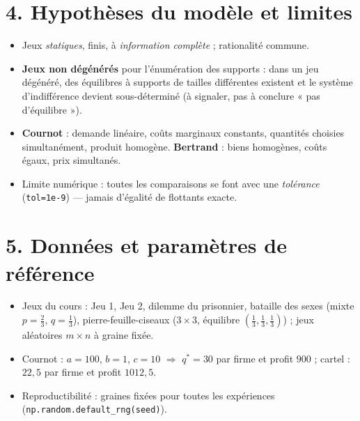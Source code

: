 \documentclass[11pt,a4paper]{article}
\begin{document}
\section*{4. Hypothèses du modèle et limites}
\begin{itemize}
  \item Jeux \emph{statiques}, finis, à \emph{information complète} ; rationalité commune.
  \item \textbf{Jeux non dégénérés} pour l'énumération des supports : dans un jeu dégénéré, des
        équilibres à supports de tailles différentes existent et le système d'indifférence
        devient sous-déterminé (à signaler, pas à conclure « pas d'équilibre »).
  \item \textbf{Cournot} : demande linéaire, coûts marginaux constants, quantités choisies
        simultanément, produit homogène. \textbf{Bertrand} : biens homogènes, coûts égaux,
        prix simultanés.
  \item Limite numérique : toutes les comparaisons se font avec une \emph{tolérance}
        (\texttt{tol=1e-9}) --- jamais d'égalité de flottants exacte.
\end{itemize}

\section*{5. Données et paramètres de référence}
\begin{itemize}
  \item Jeux du cours : Jeu 1, Jeu 2, dilemme du prisonnier, bataille des sexes
        (mixte $p=\tfrac23$, $q=\tfrac13$), pierre-feuille-ciseaux ($3\times3$, équilibre
        $(\tfrac13,\tfrac13,\tfrac13)$) ; jeux aléatoires $m\times n$ à graine fixée.
  \item Cournot : $a=100$, $b=1$, $c=10$ $\Rightarrow$ $q^{*}=30$ par firme et profit $900$ ;
        cartel : $22{,}5$ par firme et profit $1012{,}5$.
  \item Reproductibilité : graines fixées pour toutes les expériences
        (\texttt{np.random.default\_rng(seed)}).
\end{itemize}
\end{document}

